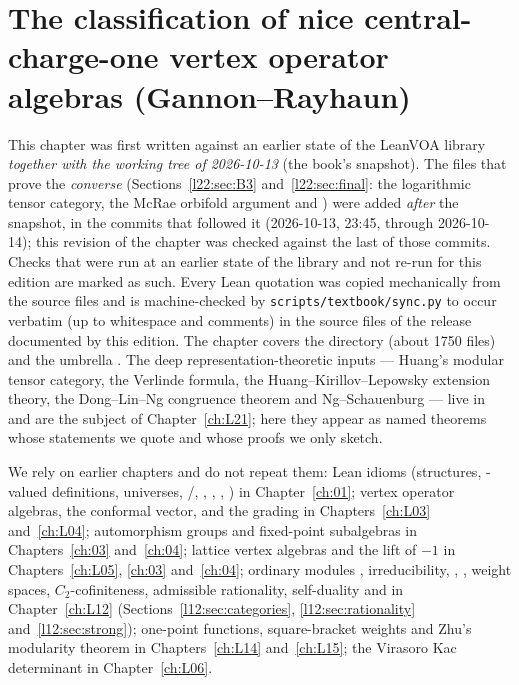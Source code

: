 \chapter{The classification of nice central-charge-one vertex operator algebras (Gannon--Rayhaun)}\label{ch:L22}
\begingroup\setlength{\emergencystretch}{3em}\sloppy

\providecommand{\ltwotwoS}{S_{00}}
\providecommand{\ltwotwoch}{\operatorname{ch}}
\providecommand{\ltwotwoH}{\mathbb{H}}
\providecommand{\ltwotwoSL}{\mathrm{SL}_2(\Z)}

This chapter was first written against an earlier state of the LeanVOA library \emph{together with the
working tree of 2026-10-13} (the book's snapshot). The files that prove the \emph{converse}
(Sections~\ref{l22:sec:B3} and~\ref{l22:sec:final}: the logarithmic tensor category, the McRae orbifold argument and
) were added \emph{after} the snapshot, in the commits that followed it
(2026-10-13, 23:45, through 2026-10-14); this revision of the chapter was
checked against the last of those commits. Checks that were run at an earlier state of the library and not re-run
for this edition are marked as such. Every Lean quotation was copied mechanically from the source files and is
machine-checked by \texttt{scripts/textbook/sync.py} to occur verbatim (up to whitespace and comments) in the source files of the release documented by this edition. The chapter covers
the directory  (about 1750 files) and the umbrella
. The deep representation-theoretic inputs ---
Huang's modular tensor category, the Verlinde formula, the Huang--Kirillov--Lepowsky extension theory,
the Dong--Lin--Ng congruence theorem and Ng--Schauenburg --- live in  and
are the subject of Chapter~\ref{ch:L21}; here they appear as named theorems whose statements we quote
and whose proofs we only sketch.

We rely on earlier chapters and do not repeat them: Lean idioms (structures, -valued
definitions, universes, /, , , , )
in Chapter~\ref{ch:01}; vertex operator algebras, the conformal vector,  and the
grading  in Chapters~\ref{ch:L03} and~\ref{ch:L04}; automorphism groups 
and fixed-point subalgebras  in Chapters~\ref{ch:03} and~\ref{ch:04}; lattice vertex
algebras  and the lift  of $-1$ in Chapters~\ref{ch:L05}, \ref{ch:03}
and~\ref{ch:04}; ordinary modules , irreducibility, ,
, weight spaces, $C_2$-cofiniteness, admissible rationality, self-duality and
 in Chapter~\ref{ch:L12} (Sections~\ref{l12:sec:categories},
\ref{l12:sec:rationality} and~\ref{l12:sec:strong}); one-point functions, square-bracket weights and Zhu's
modularity theorem in Chapters~\ref{ch:L14} and~\ref{ch:L15}; the Virasoro Kac determinant in
Chapter~\ref{ch:L06}.

